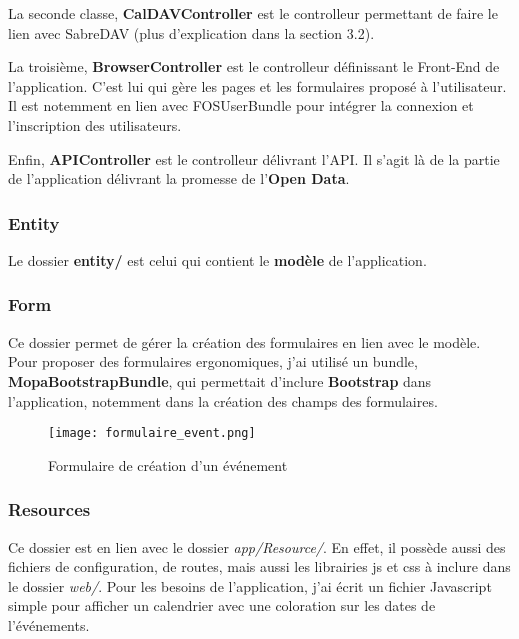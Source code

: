 La seconde classe, \textbf{CalDAVController} est le controlleur permettant de faire le lien avec SabreDAV (plus d'explication dans la section 3.2).

La troisième, \textbf{BrowserController} est le controlleur définissant le Front-End de l'application. C'est lui qui gère les pages et les formulaires proposé à l'utilisateur. Il est notemment en lien avec FOSUserBundle pour intégrer la connexion et l'inscription des utilisateurs.

Enfin, \textbf{APIController} est le controlleur délivrant l'API. Il s'agit là de la partie de l'application délivrant la promesse de l'\textbf{Open Data}.

\subsubsection*{Entity}

Le dossier \textbf{entity/} est celui qui contient le \textbf{modèle} de l'application.


\subsubsection*{Form}

Ce dossier permet de gérer la création des formulaires en lien avec le modèle. Pour proposer des formulaires ergonomiques, j'ai utilisé un bundle, \textbf{MopaBootstrapBundle}, qui permettait d'inclure \textbf{Bootstrap} dans l'application, notemment dans la création des champs des formulaires.

\begin{figure}[h]
\begin{center}
\texttt{[image: formulaire\_event.png]}
\end{center}
\caption{Formulaire de création d'un événement}
\end{figure}

\newpage

\subsubsection*{Resources}

Ce dossier est en lien avec le dossier \textit{app/Resource/}. En effet, il possède aussi des fichiers de configuration, de routes, mais aussi les librairies js et css à inclure dans le dossier \textit{web/}. Pour les besoins de l'application, j'ai écrit un fichier Javascript simple pour afficher un calendrier avec une coloration sur les dates de l'événements.

